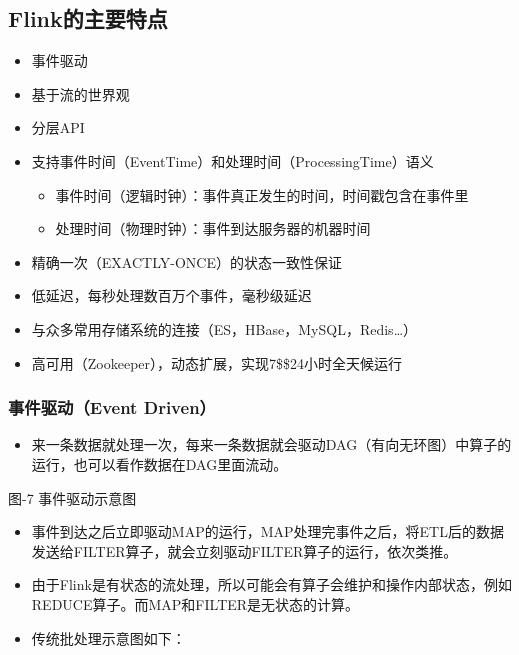 \hypertarget{flinkux7684ux4e3bux8981ux7279ux70b9}{%
\subsection{Flink的主要特点}\label{flinkux7684ux4e3bux8981ux7279ux70b9}}

\begin{itemize}
\tightlist
\item
  事件驱动
\item
  基于流的世界观
\item
  分层API
\item
  支持事件时间（EventTime）和处理时间（ProcessingTime）语义

  \begin{itemize}
  \tightlist
  \item
    事件时间（逻辑时钟）：事件真正发生的时间，时间戳包含在事件里
  \item
    处理时间（物理时钟）：事件到达服务器的机器时间
  \end{itemize}
\item
  精确一次（EXACTLY-ONCE）的状态一致性保证
\item
  低延迟，每秒处理数百万个事件，毫秒级延迟
\item
  与众多常用存储系统的连接（ES，HBase，MySQL，Redis\ldots）
\item
  高可用（Zookeeper），动态扩展，实现7\$\times\$24小时全天候运行
\end{itemize}

\hypertarget{ux4e8bux4ef6ux9a71ux52a8event-driven}{%
\subsubsection{事件驱动（Event
Driven）}\label{ux4e8bux4ef6ux9a71ux52a8event-driven}}

\begin{itemize}
\tightlist
\item
  来一条数据就处理一次，每来一条数据就会驱动DAG（有向无环图）中算子的运行，也可以看作数据在DAG里面流动。
\end{itemize}

图-7 事件驱动示意图

\begin{itemize}
\tightlist
\item
  事件到达之后立即驱动MAP的运行，MAP处理完事件之后，将ETL后的数据发送给FILTER算子，就会立刻驱动FILTER算子的运行，依次类推。
\item
  由于Flink是有状态的流处理，所以可能会有算子会维护和操作内部状态，例如REDUCE算子。而MAP和FILTER是无状态的计算。
\item
  传统批处理示意图如下：
\end{itemize}

